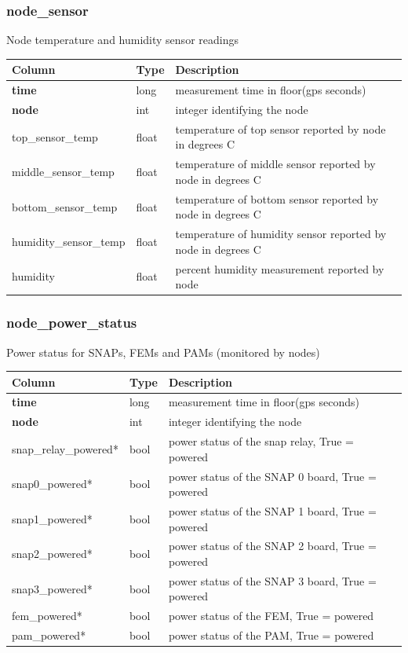 \documentclass{article}
\begin{document}
{\subsubsection{node\_sensor}
Node temperature and humidity sensor readings
\begin{center}
 \begin{tabular}{| p{4cm} | p{2cm} | p{10cm} |}
\hline
 {\bf Column} & {\bf Type}  & {\bf Description} \\ [0.5ex]  \hline\hline
\textbf{time} & long & measurement time in floor(gps seconds)\\ \hline
\textbf{node} & int & integer identifying the node \\ \hline
top\_sensor\_temp & float & temperature of top sensor reported by node in degrees C \\\hline
middle\_sensor\_temp & float & temperature of middle sensor reported by node in degrees C \\\hline
bottom\_sensor\_temp & float & temperature of bottom sensor reported by node in degrees C \\\hline
humidity\_sensor\_temp & float & temperature of humidity sensor reported by node in degrees C \\\hline
humidity & float & percent humidity measurement reported by node\\\hline
\end{tabular}
\end{center}

\subsubsection{node\_power\_status}
Power status for SNAPs, FEMs and PAMs (monitored by nodes)
\begin{center}
 \begin{tabular}{| p{4cm} | p{2cm} | p{10cm} |}
\hline
 {\bf Column} & {\bf Type}  & {\bf Description} \\ [0.5ex]  \hline\hline
\textbf{time} & long & measurement time in floor(gps seconds)\\ \hline
\textbf{node} & int & integer identifying the node \\ \hline
snap\_relay\_powered* & bool & power status of the snap relay, True = powered \\\hline
snap0\_powered* & bool & power status of the SNAP 0 board, True = powered \\\hline
snap1\_powered* & bool & power status of the SNAP 1 board, True = powered \\\hline
snap2\_powered* & bool & power status of the SNAP 2 board, True = powered \\\hline
snap3\_powered* & bool & power status of the SNAP 3 board, True = powered \\\hline
fem\_powered* & bool & power status of the FEM, True = powered \\\hline
pam\_powered* & bool & power status of the PAM, True = powered \\\hline
\end{tabular}
\end{center}

}
\end{document}
